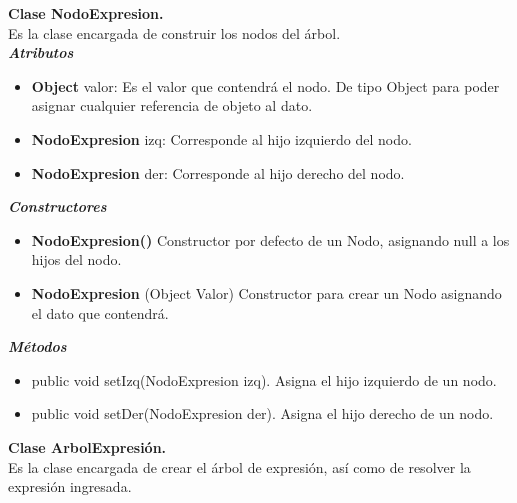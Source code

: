 \documentclass{article}
\begin{document}
\textbf{Clase NodoExpresion.}\\

Es la clase encargada de construir los nodos del árbol.\\

\textit{\textbf{Atributos}}
\begin{itemize}
\item \textbf{Object} valor: Es el valor que contendrá el nodo. De tipo Object para poder asignar cualquier referencia de objeto al dato.
\item \textbf{NodoExpresion} izq: Corresponde al hijo izquierdo del nodo.
\item \textbf{NodoExpresion} der: Corresponde al hijo derecho del nodo.
\end{itemize}
\vspace{5mm} %
\textit{\textbf{Constructores}}
\begin{itemize}
\item \textbf{NodoExpresion()} Constructor por defecto de un Nodo, asignando null a los hijos del nodo.
\item \textbf{NodoExpresion} (Object Valor) Constructor para crear un Nodo asignando el dato que contendrá.
\end{itemize}
\vspace{5mm} %
\textit{\textbf{Métodos}}
\begin{itemize}
    \item public  void setIzq(NodoExpresion izq). Asigna el hijo izquierdo de un nodo.
    \item public void setDer(NodoExpresion der). Asigna el hijo derecho de un nodo.
\end{itemize}

\textbf{Clase ArbolExpresión.}\\

Es la clase encargada de crear el árbol de expresión, así como de resolver la expresión ingresada.\\
\end{document}
